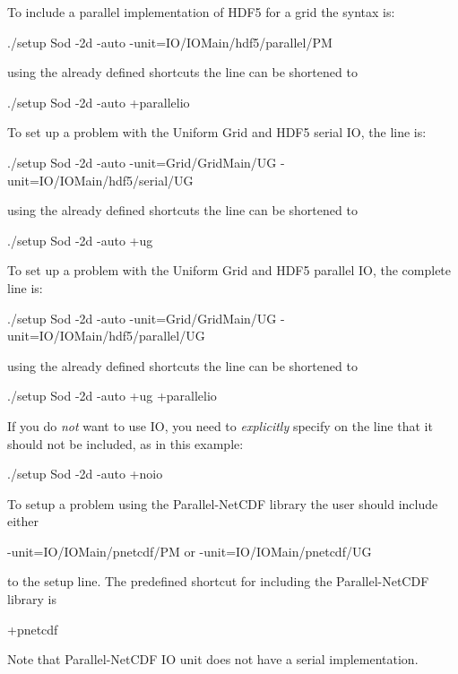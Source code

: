 To include a parallel implementation of HDF5 for a \Paramesh grid the
 syntax is:
\begin{codeseg}
./setup Sod -2d -auto -unit=IO/IOMain/hdf5/parallel/PM
\end{codeseg}

using the already defined shortcuts the  line can be shortened to
\begin{codeseg}
./setup Sod -2d -auto +parallelio
\end{codeseg}





To set up a problem with the Uniform Grid and HDF5 serial IO,
 the  line is:
\begin{codeseg}
./setup Sod -2d -auto -unit=Grid/GridMain/UG -unit=IO/IOMain/hdf5/serial/UG
\end{codeseg}

using the already defined shortcuts the  line can be shortened to
\begin{codeseg}
./setup Sod -2d -auto +ug
\end{codeseg}



To set up a problem with the Uniform Grid and HDF5 parallel IO,
 the complete  line is:
\begin{codeseg}
./setup Sod -2d -auto -unit=Grid/GridMain/UG -unit=IO/IOMain/hdf5/parallel/UG
\end{codeseg}

using the already defined shortcuts the  line can be shortened to
\begin{codeseg}
./setup Sod -2d -auto +ug  +parallelio
\end{codeseg}

If you do \emph{not} want to use IO, you need to \emph{explicitly} specify on the
 line that it should not be included, as in this example:
\begin{codeseg}
./setup Sod -2d -auto +noio
\end{codeseg}


To setup a problem using the Parallel-NetCDF library the user should include either
\begin{codeseg}
-unit=IO/IOMain/pnetcdf/PM or -unit=IO/IOMain/pnetcdf/UG
\end{codeseg}
to the setup line.  The predefined shortcut for including the Parallel-NetCDF library is
\begin{codeseg}
+pnetcdf
\end{codeseg}
Note that Parallel-NetCDF IO unit does not have a serial implementation.

